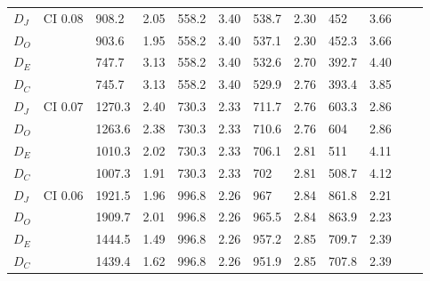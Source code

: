 \begin{table*}[h]
\begin{tabular}{|l|l|llllllllll|}
\hline
$D_J$   & \multirow{4}{*}{CI 0.08} & 908.2        & 2.05          & 558.2        & 3.40          & 538.7        & 2.30         & 452        & 3.66        &             &             \\
$D_O$    &                           & 903.6        & 1.95          & 558.2        & 3.40          & 537.1        & 2.30         & 452.3      & 3.66        &             &             \\
$D_E$ &                           & 747.7        & 3.13          & 558.2        & 3.40          & 532.6        & 2.70         & 392.7      & 4.40        &             &             \\
$D_C$    &                           & 745.7        & 3.13          & 558.2        & 3.40          & 529.9        & 2.76         & 393.4      & 3.85        &             &             \\
\hline
$D_J$   & \multirow{4}{*}{CI 0.07} & 1270.3       & 2.40          & 730.3        & 2.33          & 711.7        & 2.76         & 603.3      & 2.86        &             &             \\
$D_O$    &                           & 1263.6       & 2.38          & 730.3        & 2.33          & 710.6        & 2.76         & 604        & 2.86        &             &             \\
$D_E$ &                           & 1010.3       & 2.02          & 730.3        & 2.33          & 706.1        & 2.81         & 511        & 4.11        &             &             \\
$D_C$    &                           & 1007.3       & 1.91          & 730.3        & 2.33          & 702          & 2.81         & 508.7      & 4.12        &             &             \\
\hline
$D_J$   & \multirow{4}{*}{CI 0.06} & 1921.5       & 1.96          & 996.8        & 2.26          & 967          & 2.84         & 861.8      & 2.21        &             &             \\
$D_O$    &                           & 1909.7       & 2.01          & 996.8        & 2.26          & 965.5        & 2.84         & 863.9      & 2.23        &             &             \\
$D_E$ &                           & 1444.5       & 1.49          & 996.8        & 2.26          & 957.2        & 2.85         & 709.7      & 2.39        &             &             \\
$D_C$    &                           & 1439.4       & 1.62          & 996.8        & 2.26          & 951.9        & 2.85         & 707.8      & 2.39        &             &             \\

\end{tabular}
\end{table*}
